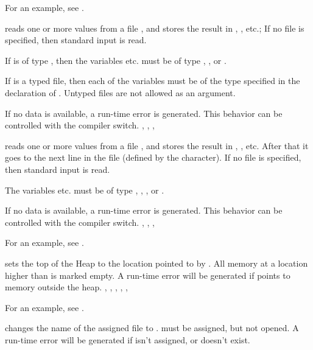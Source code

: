 \documentclass{report}
\begin{document}
For an example, see .

{ reads one or more values from a file , and stores the
result in , , etc.; If no file  is specified, then
standard input is read.

If  is of type , then the variables  etc. must be
of type , ,  or .

If  is a typed file, then each of the variables must be of the type
specified in the declaration of . Untyped files are not allowed as an
argument.}
{If no data is available, a run-time error is generated. This behavior can
be controlled with the  compiler switch.}
{, , , }


\html{}

{ reads one or more values from a file , and stores the
result in , , etc. After that it goes to the next line in
the file (defined by the  character). 
If no file  is specified, then standard input is read.

The variables  etc. must be of type , , 
,  or .
}
{If no data is available, a run-time error is generated. This behavior can
be controlled with the  compiler switch.}
{, , , }

For an example, see .

{ sets the top of the Heap to the location pointed to by
. All memory at a location higher than  is marked empty.}
{A run-time error will be generated if  points to memory outside the
heap.}
{, , , , 
, }

For an example, see .

{ changes the name of the assigned file  to .
must be assigned, but not opened.}
{A run-time error will be generated if  isn't assigned, 
or doesn't exist.}
{}
\end{document}
